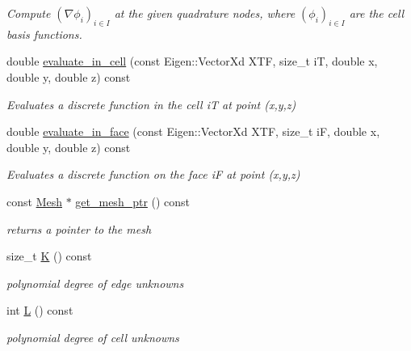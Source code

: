 \begin{DoxyCompactItemize}
\begin{DoxyCompactList}\small\item\em Compute $(\nabla \phi_i)_{i\in I}$ at the given quadrature nodes, where $(\phi_i)_{i\in I}$ are the cell basis functions. \end{DoxyCompactList}\item 
\mbox{\label{classHArDCore3D_1_1HybridCore_a19e0febebb2735a8cc7017873683b611}} 
double \hyperlink{classHArDCore3D_1_1HybridCore_a19e0febebb2735a8cc7017873683b611}{evaluate\+\_\+in\+\_\+cell} (const Eigen\+::\+Vector\+Xd X\+TF, size\+\_\+t iT, double x, double y, double z) const
\begin{DoxyCompactList}\small\item\em Evaluates a discrete function in the cell iT at point (x,y,z) \end{DoxyCompactList}\item 
\mbox{\label{classHArDCore3D_1_1HybridCore_a7364c571c3ecadb5a7025047478b3e40}} 
double \hyperlink{classHArDCore3D_1_1HybridCore_a7364c571c3ecadb5a7025047478b3e40}{evaluate\+\_\+in\+\_\+face} (const Eigen\+::\+Vector\+Xd X\+TF, size\+\_\+t iF, double x, double y, double z) const
\begin{DoxyCompactList}\small\item\em Evaluates a discrete function on the face iF at point (x,y,z) \end{DoxyCompactList}\item 
const \hyperlink{classHArDCore3D_1_1Mesh}{Mesh} $\ast$ \hyperlink{group__HybridCore_gad4c32f117a1e67ec4a13dd9656c404e8}{get\+\_\+mesh\+\_\+ptr} () const
\begin{DoxyCompactList}\small\item\em returns a pointer to the mesh \end{DoxyCompactList}\item 
size\+\_\+t \hyperlink{group__HybridCore_ga5c5d20faf615bca6e170961a61464fb2}{K} () const
\begin{DoxyCompactList}\small\item\em polynomial degree of edge unknowns \end{DoxyCompactList}\item 
int \hyperlink{group__HybridCore_gae2bb060c207a888bf97a9d2a9626e1c0}{L} () const
\begin{DoxyCompactList}\small\item\em polynomial degree of cell unknowns \end{DoxyCompactList}\item 

\end{DoxyCompactItemize}
